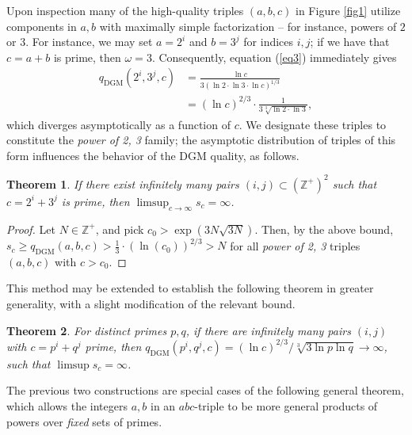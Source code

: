 \documentclass[11pt,letterpaper]{amsart}
\newtheorem{theorem}{Theorem}[section]
\def\Z{\mathbb{Z}}
\def\Z{\mathbb{Z}}
\begin{document}
Upon inspection many of the high-quality triples $(a, b, c)$ in Figure \ref{fig1} utilize components in $a, b$ with maximally simple factorization – for instance, powers of $2$ or $3$. For instance, we may set $a=2^i$ and $b=3^j$ for indices $i,j$; if we have that $c=a+b$ is prime, then $\omega=3$. Consequently, equation (\ref{eq3}) immediately gives
\begin{align*}
q_{\mathrm{DGM}}(2^i,3^j,c) &= \frac{\ln c}{3({\ln 2\cdot\ln 3\cdot\ln c})^{1/3}}\\
&= (\ln c)^{2/3}\cdot\frac{1}{3\sqrt[3]{\ln 2\cdot\ln 3}},
\end{align*}
which diverges asymptotically as a function of $c$. We designate these triples to constitute the \textit{power of 2, 3} family; the asymptotic distribution of triples of this form influences the  behavior of the DGM quality, as follows.
\begin{theorem}\label{T_2_3}
If there exist infinitely many pairs $(i,j) \subset (\Z^{+})^2$ such that $c=2^i+3^j$ is prime, then $\limsup_{c\to\infty}s_c=\infty$.
\end{theorem}
\begin{proof}
Let $N\in\Z^{+}$, and pick $c_0>\exp(3N\sqrt{3N})$. Then, by the above bound, $s_c \ge q_{\mathrm{DGM}}(a, b, c)>\frac{1}{3}\cdot (\ln(c_0))^{2/3}>N$ for all \textit{power of 2, 3} triples $(a, b, c)$ with $c>c_0$.
\end{proof}
This method may be extended to establish the following theorem in greater generality, with a slight modification of the relevant bound.
\begin{theorem}\label{T_power_of_p_q}
For distinct primes $p,q$, if there are infinitely many pairs $(i,j)$ with $c=p^i+q^j$ prime, then
$q_{\mathrm{DGM}}(p^i,q^j,c)=(\ln c)^{2/3}/\sqrt[3]{3\ln p\ln q}\to\infty$, such that $\limsup s_c=\infty$.
\end{theorem}

The previous two constructions are special cases of the following general theorem, which allows the integers $a,b$ in an $abc$-triple to be more general products of powers over \textit{fixed} sets of primes.
\end{document}
